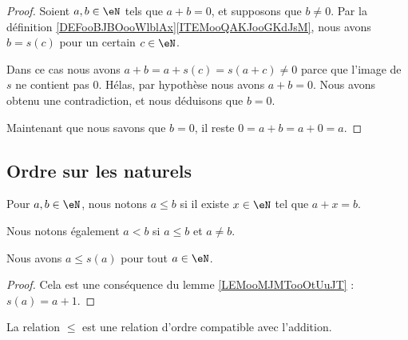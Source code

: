 \begin{proof}
	Soient \( a,b\in \eN\) tels que \( a+b=0\), et supposons que \( b\neq 0\). Par la définition \ref{DEFooBJBOooWlblAx}\ref{ITEMooQAKJooGKdJsM}, nous avons \( b=s(c)\) pour un certain \( c\in \eN\).

	Dans ce cas nous avons \( a+b=a+s(c)=s(a+c)\neq 0\) parce que l'image de \( s\) ne contient pas \( 0\). Hélas, par hypothèse nous avons \( a+b=0\). Nous avons obtenu une contradiction, et nous déduisons que \( b=0\).

	Maintenant que nous savons que \( b=0\), il reste \( 0=a+b=a+0=a\).
\end{proof}

\subsection{Ordre sur les naturels}
\label{SUBooOrdreNaturels}

\begin{definition}     \label{DEFooAXZSooTEMjlV}
	Pour \( a,b\in \eN\), nous notons \( a\leq b\) si il existe \( x\in \eN\) tel que \( a+x=b\).

	Nous notons également \( a<b \) si \( a\leq b\) et \( a\neq b\).
\end{definition}

\begin{lemma}       \label{LEMooWMYPooLTMyWb}
	Nous avons \( a\leq s(a)\) pour tout \( a\in \eN\).
\end{lemma}

\begin{proof}
	Cela est une conséquence du lemme \ref{LEMooMJMTooOtUuJT} : \( s(a)=a+1\).
\end{proof}

\begin{proposition}     \label{PROPooVXBBooZcghrA}
	La relation \( \leq\) est une relation d'ordre compatible avec l'addition.
\end{proposition}

